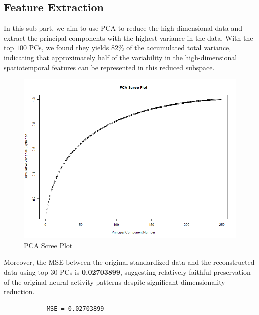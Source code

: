\documentclass{article}
\begin{document}
	\subsection{Feature Extraction}
	\par In this sub-part, we aim to use PCA to reduce the high dimensional data and extract the principal components with the highest variance in the data. With the top $100$ PCs, we found they yields $82\%$ of the accumulated total variance, indicating that approximately half of the variability in the high-dimensional spatiotemporal features can be represented in this reduced subspace.
	\begin{figure}[htbp]
		\centering
		\includegraphics[scale = 0.4]{Pics/pca_scree_plot}
		\caption{PCA Scree Plot}
		\label{fig:pcascreeplot}
	\end{figure}
	
	\par Moreover, the MSE between the original standardized data and the reconstructed data using top $30$ PCs is \textbf{0.02703899}, suggesting relatively faithful preservation of the original neural activity patterns despite significant dimensionality reduction.
		\begin{framed}
		\begin{verbatim}
			MSE = 0.02703899 
		\end{verbatim}
	\end{framed}
	\clearpage
\end{document}
